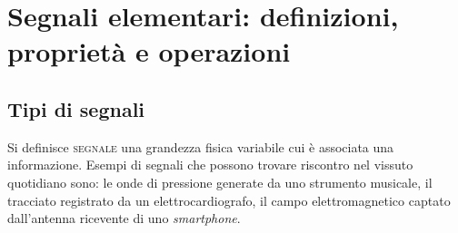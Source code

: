 \chapter{Segnali elementari: definizioni, propriet\`a e operazioni}\label{Capitolo1}
\section{Tipi di segnali}
Si definisce \textsc{segnale} una grandezza fisica variabile cui è associata una informazione. Esempi di segnali che possono trovare riscontro nel vissuto quotidiano sono: le onde di pressione generate da uno strumento musicale, il tracciato registrato da un elettrocardiografo, il campo elettromagnetico captato dall'antenna ricevente di uno \textit{smartphone}.

